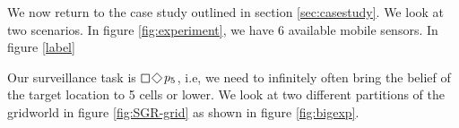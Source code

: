 We now return to the case study outlined in section \ref{sec:casestudy}. We look at two scenarios. In figure \ref{fig:experiment}, we have 6 available mobile sensors. In figure \ref{label}

 Our surveillance task is $\LTLsquare \LTLdiamond p_5$, i.e, we need to infinitely often bring the belief of the target location to 5 cells or lower. We look at two different partitions of the gridworld in figure \ref{fig:SGR-grid} as shown in figure \ref{fig:bigexp}.

\begin{figure}
{}
\end{figure}
